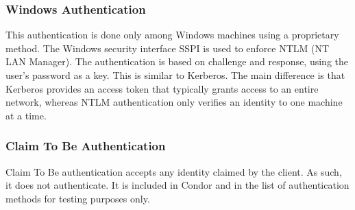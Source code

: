 

\subsubsection{\label{sec:NTSSPI-Authentication}Windows Authentication}
This authentication is done only among Windows machines using
a proprietary method.
The Windows security interface SSPI is used to enforce NTLM
(NT LAN Manager).
The authentication is based on challenge and response, using the user's
password as a key.
This is similar to Kerberos.
The main difference 
is that Kerberos provides an access token that typically grants
access to an entire network, whereas NTLM authentication only 
verifies an identity to one machine at a time.

\subsubsection{\label{sec:CLAIM-Authentication}Claim To Be Authentication}
Claim To Be authentication accepts any identity claimed by the client.
As such, it does not authenticate.
It is included in Condor and in the list of authentication methods
for testing purposes only.

